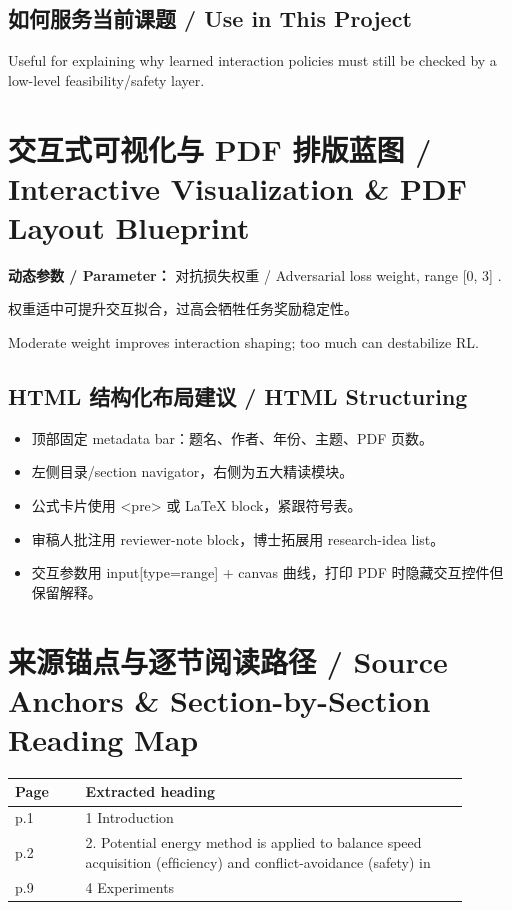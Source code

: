 \documentclass[UTF8,a4paper,11pt,fontset=fandol]{ctexart}
\begin{document}
\subsection{如何服务当前课题 / Use in This Project}
Useful for explaining why learned interaction policies must still be checked by a low-level feasibility/safety layer.

\section{交互式可视化与 PDF 排版蓝图 / Interactive Visualization \& PDF Layout Blueprint}
\textbf{动态参数 / Parameter：} 对抗损失权重 / Adversarial loss weight, range [0, 3] .

权重适中可提升交互拟合，过高会牺牲任务奖励稳定性。

Moderate weight improves interaction shaping; too much can destabilize RL.

\subsection{HTML 结构化布局建议 / HTML Structuring}
\begin{itemize}
\item 顶部固定 metadata bar：题名、作者、年份、主题、PDF 页数。
\item 左侧目录/section navigator，右侧为五大精读模块。
\item 公式卡片使用 <pre> 或 LaTeX block，紧跟符号表。
\item 审稿人批注用 reviewer-note block，博士拓展用 research-idea list。
\item 交互参数用 input[type=range] + canvas 曲线，打印 PDF 时隐藏交互控件但保留解释。
\end{itemize}


\section{来源锚点与逐节阅读路径 / Source Anchors \& Section-by-Section Reading Map}
\begin{longtable}{p{0.14\linewidth}p{0.76\linewidth}}
\toprule
Page & Extracted heading\\
\midrule
p.1 & 1 Introduction \\
p.2 & 2. Potential energy method is applied to balance speed acquisition (efﬁciency) and conﬂict-avoidance (safety) in \\
p.9 & 4 Experiments \\
\bottomrule
\end{longtable}
\end{document}
